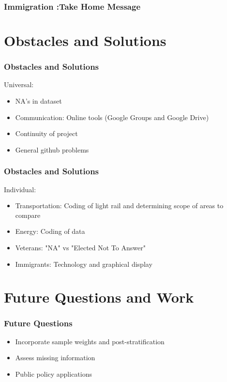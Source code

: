 \documentclass{beamer}
\begin{document}
\begin{frame}
\frametitle{Immigration :Take Home Message}


\end{frame}



\section{Obstacles and Solutions }
\begin{frame}
\frametitle{Obstacles and Solutions}
Universal:
\begin{itemize}
\item NA's in dataset
\item Communication: Online tools (Google Groups and Google Drive)
\item Continuity of project
\item General github problems
\end{itemize}
\end{frame}

\begin{frame}
\frametitle{Obstacles and Solutions}
Individual:
\begin{itemize}
\item Transportation: Coding of light rail and determining scope of areas to compare
\item Energy: Coding of data
\item Veterans: "NA" vs "Elected Not To Answer"
\item Immigrants: Technology and graphical display
\end{itemize}
\end{frame}

\section{Future Questions and Work}
\begin{frame}
\frametitle{Future Questions}
\begin{itemize}
\item Incorporate sample weights and post-stratification 
\item Assess missing information 
\item Public policy applications 
\end{itemize}
\end{frame}
\end{document}
